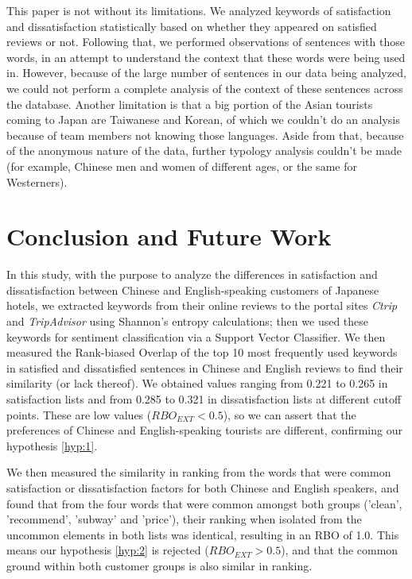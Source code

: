 This paper is not without its limitations. We analyzed keywords of satisfaction and dissatisfaction statistically based on whether they appeared on satisfied reviews or not. Following that, we performed observations of sentences with those words, in an attempt to understand the context that these words were being used in. However, because of the large number of sentences in our data being analyzed, we could not perform a complete analysis of the context of these sentences across the database. Another limitation is that a big portion of the Asian tourists coming to Japan are Taiwanese and Korean, of which we couldn't do an analysis because of team members not knowing those languages. Aside from that, because of the anonymous nature of the data, further typology analysis couldn't be made (for example, Chinese men and women of different ages, or the same for Westerners).

\section{Conclusion and Future Work}\label{conclusion}

In this study, with the purpose to analyze the differences in satisfaction and dissatisfaction between Chinese and English-speaking customers of Japanese hotels, we extracted keywords from their online reviews to the portal sites \textit{Ctrip} and \textit{TripAdvisor} using Shannon's entropy calculations; then we used these keywords for sentiment classification via a Support Vector Classifier. We then measured the Rank-biased Overlap of the top 10 most frequently used keywords in satisfied and dissatisfied sentences in Chinese and English reviews to find their similarity (or lack thereof). We obtained values ranging from 0.221 to 0.265 in satisfaction lists and from 0.285 to 0.321 in dissatisfaction lists at different cutoff points. These are low values (\(RBO_{EXT} < 0.5\)), so we can assert that the preferences of Chinese and English-speaking tourists are different, confirming our hypothesis \ref{hyp:1}. 

We then measured the similarity in ranking from the words that were common satisfaction or dissatisfaction factors for both Chinese and English speakers, and found that from the four words that were common amongst both groups ('clean', 'recommend', 'subway' and 'price'), their ranking when isolated from the uncommon elements in both lists was identical, resulting in an RBO of 1.0. This means our hypothesis \ref{hyp:2} is rejected (\(RBO_{EXT} > 0.5\)), and that the common ground within both customer groups is also similar in ranking.

